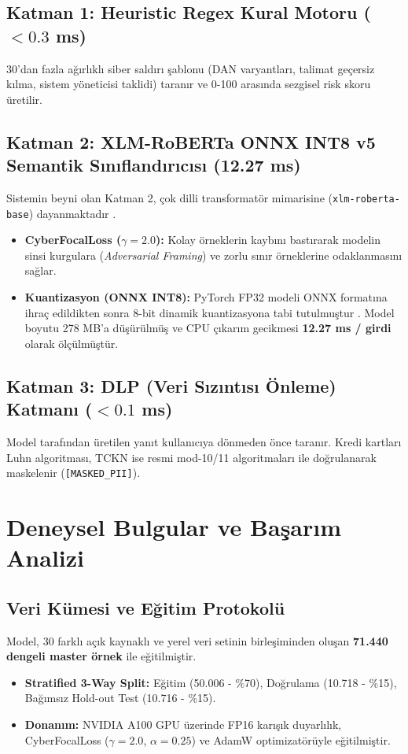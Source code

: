 \documentclass[conference]{IEEEtran}
\begin{document}
\subsection{Katman 1: Heuristic Regex Kural Motoru ($<0.3$ ms)}
30'dan fazla ağırlıklı siber saldırı şablonu (DAN varyantları, talimat geçersiz kılma, sistem yöneticisi taklidi) taranır ve 0-100 arasında sezgisel risk skoru üretilir.

\subsection{Katman 2: XLM-RoBERTa ONNX INT8 v5 Semantik Sınıflandırıcısı (12.27 ms)}
Sistemin beyni olan Katman 2, çok dilli transformatör mimarisine (\texttt{xlm-roberta-base}) dayanmaktadır \cite{conneau2020}.
\begin{itemize}
    \item \textbf{CyberFocalLoss ($\gamma=2.0$):} Kolay örneklerin kaybını bastırarak modelin sinsi kurgulara (\textit{Adversarial Framing}) ve zorlu sınır örneklerine odaklanmasını sağlar.
    \item \textbf{Kuantizasyon (ONNX INT8):} PyTorch FP32 modeli ONNX formatına ihraç edildikten sonra 8-bit dinamik kuantizasyona tabi tutulmuştur \cite{onnxruntime}. Model boyutu 278 MB'a düşürülmüş ve CPU çıkarım gecikmesi \textbf{12.27 ms / girdi} olarak ölçülmüştür.
\end{itemize}

\subsection{Katman 3: DLP (Veri Sızıntısı Önleme) Katmanı ($<0.1$ ms)}
Model tarafından üretilen yanıt kullanıcıya dönmeden önce taranır. Kredi kartları Luhn algoritması, TCKN ise resmi mod-10/11 algoritmaları ile doğrulanarak maskelenir (\texttt{[MASKED\_PII]}).

\section{Deneysel Bulgular ve Başarım Analizi}

\subsection{Veri Kümesi ve Eğitim Protokolü}
Model, 30 farklı açık kaynaklı ve yerel veri setinin birleşiminden oluşan \textbf{71.440 dengeli master örnek} ile eğitilmiştir.
\begin{itemize}
    \item \textbf{Stratified 3-Way Split:} Eğitim (50.006 - \%70), Doğrulama (10.718 - \%15), Bağımsız Hold-out Test (10.716 - \%15).
    \item \textbf{Donanım:} NVIDIA A100 GPU üzerinde FP16 karışık duyarlılık, CyberFocalLoss ($\gamma=2.0$, $\alpha=0.25$) ve AdamW optimizatörüyle eğitilmiştir.
\end{itemize}
\end{document}
